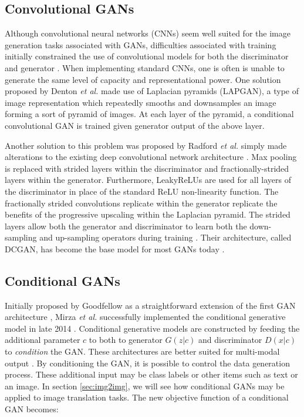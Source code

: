 \documentclass[11pt]{article}
\begin{document}
\subsection{Convolutional GANs}
Although convolutional neural networks (CNNs) seem well suited for the image generation tasks associated with GANs, difficulties associated with training initially constrained the use of convolutional models for both the discriminator and generator \citep{2017arXiv171007035C}. When implementing standard CNNs, one is often is unable to generate the same level of capacity and representational power. One solution proposed by Denton \textit{et al.} made use of Laplacian pyramids (LAPGAN), a type of image representation which repeatedly smooths and downsamples an image forming a sort of pyramid of images. At each layer of the pyramid, a conditional convolutional GAN is trained given generator output of the above layer.

Another solution to this problem was proposed by Radford \textit{et al.}  simply made alterations to the existing deep convolutional network architecture \citep{2015arXiv151106434R}. Max pooling is replaced with strided layers within the discriminator and fractionally-strided layers within the generator. Furthermore, LeakyReLUs are used for all layers of the discriminator in place of the standard ReLU non-linearity function. The fractionally strided convolutions replicate within the generator replicate the benefits of the progressive upscaling within the Laplacian pyramid. The strided layers allow both the generator and discriminator to learn both the down-sampling and up-sampling operators during training \citep{2017arXiv171007035C}. Their architecture, called DCGAN, has become the base model for most GANs today \citep{2017arXiv170100160G}.

\subsection{Conditional GANs}
Initially proposed by Goodfellow as a straightforward extension of the first GAN architecture \citep{2014arXiv1406.2661G}, Mirza \textit{et al.} successfully implemented the conditional generative model in late 2014 \citep{2014arXiv1411.1784M}. Conditional generative models are constructed by feeding the additional parameter $c$ to both to generator $G(z|c)$ and discriminator $D(x|c)$ to \textit{condition} the GAN. These architectures are better suited for multi-modal output \citep{2017arXiv171007035C}. By conditioning the GAN, it is possible to control the data generation process. These additional input may be class labels or other items such as text or an image. In section \ref{sec:img2img}, we will see how conditional GANs may be applied to image translation tasks. The new objective function of a conditional GAN becomes:
\end{document}
